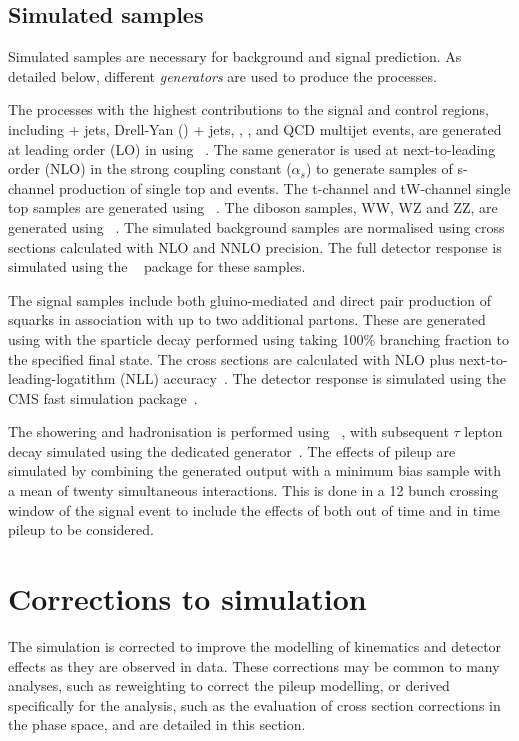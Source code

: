 \subsection{Simulated samples}
Simulated samples are necessary for background and signal prediction. As detailed below, 
different \emph{generators} are used to produce the processes.

The processes with the highest contributions to the signal and control regions, 
including \znunu + jets, Drell-Yan (\dy) + jets, \gj, \ttj, \wj and QCD multijet events, are generated at leading order (LO) 
in using \MADGRAPH \AMCATNLO~\cite{Alwall:2014hca}. The same generator is used at next-to-leading order (NLO)
in the strong coupling constant ($\alpha_s$) to generate samples of s-channel production of single top and \ttV events.
The t-channel and tW-channel single top samples are generated using \POWHEG~\cite{Alioli:2010xd}.
The diboson samples, WW, WZ and ZZ, are generated using \PYTHIA~\cite{PYTHIA}. 
The simulated background samples are normalised using cross sections calculated with NLO and NNLO precision.%
The full detector response is simulated using the \GEANTfour~\cite{Agostinelli2003250} package for these samples.

The signal samples include both gluino-mediated and direct pair production of squarks in
association with up to two additional partons. These are generated using \MADGRAPH \AMCATNLO
with the sparticle decay performed using \PYTHIA  taking 100\% branching fraction 
to the specified final state. The cross sections are calculated with
NLO plus next-to-leading-logatithm (NLL) accuracy~\cite{sparticleXs}. The detector response
is simulated using the CMS fast simulation package~\cite{fastsim}.

The showering and hadronisation is performed using \PYTHIA~\cite{PYTHIA}, with subsequent 
$\tau$ lepton decay simulated using the dedicated \TAUOLA generator~\cite{TAUOLA}. The effects
of pileup are simulated by combining the generated output with a minimum bias sample 
with a mean of twenty simultaneous interactions. This is done in a 12 bunch 
crossing window of the signal event to include the effects of both 
out of time and in time pileup to be considered.

\section{Corrections to simulation}
\label{sec:corr-sim}
The simulation is corrected to improve the modelling of kinematics and detector effects 
as they are observed in data. These corrections may be common to many analyses,
such as reweighting to correct the pileup modelling, or derived specifically for the \alphat 
analysis, such as the evaluation of cross section corrections in the \alphat phase space, 
and are detailed in this section.

